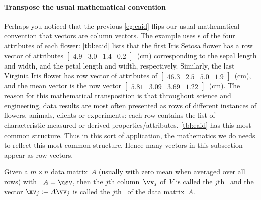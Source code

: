 \paragraph{Transpose the usual mathematical convention}
Perhaps you noticed that the previous \autoref{eg:eaid} flips our usual mathematical convention that vectors are column vectors.
The example uses s of the four attributes of each flower: 
\autoref{tbl:eaid} lists that the first Iris Setosa flower has a row vector of attributes \(\begin{bmatrix} 4.9&3.0&1.4&0.2 \end{bmatrix}\)~(cm) corresponding to the sepal length and width, and the petal length and width, respectively.
Similarly, the last Virginia Iris flower has row vector of attributes of \(\begin{bmatrix} 46.3&2.5&5.0&1.9 \end{bmatrix}\)~(cm), and the mean vector is the row vector \(\begin{bmatrix} 5.81&3.09&3.69&1.22 \end{bmatrix}\)~(cm).
The reason for this mathematical transposition is that throughout science and engineering, data results are most often presented as rows of different instances of flowers, animals, clients or experiments: each row contains the list of characteristic measured or derived properties\slash attributes.
\autoref{tbl:eaid} has this most common structure.
Thus in this sort of application, the mathematics we do needs to reflect this most common structure.
Hence many vectors in this subsection appear as row vectors.




\begin{definition} \label{def:pc}
Given a \(m\times n\) data matrix~\(A\) (usually with zero mean when averaged over all rows) with  \svd\ \(A=\usv\), then the \(j\)th column~\(\vv_j\) of~\(V\) is called the \(j\)th~ and the vector \(\xv_j:=A\vv_j\) is called the \(j\)th~ of the data matrix~\(A\).
\end{definition}



